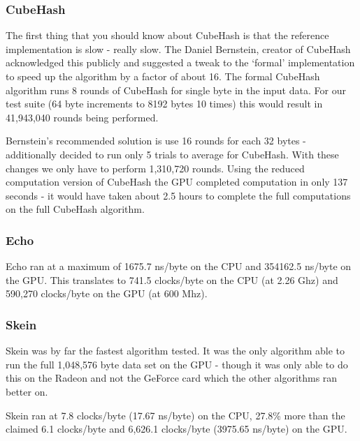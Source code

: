 \subsubsection*{CubeHash}
The first thing that you should know about CubeHash is that the reference implementation is  slow - really slow.
The Daniel Bernstein, creator of CubeHash acknowledged this publicly\cite{Bernstein} and suggested a tweak to the `formal' implementation to speed up the algorithm by a factor of about 16.
The formal CubeHash algorithm runs 8 rounds of CubeHash for single byte in the input data. For our test suite (64 byte increments to 8192 bytes 10 times) this would result in 41,943,040 rounds being performed.

Bernstein's recommended solution is use 16 rounds for each 32 bytes - additionally decided to run only 5 trials to average for CubeHash.
With these changes we only have to perform 1,310,720 rounds.
Using the reduced computation version of CubeHash the GPU completed computation in only 137 seconds - it would have taken about 2.5 hours to complete the full computations on the full CubeHash algorithm.

\subsubsection*{Echo}
Echo ran at a maximum of 1675.7 ns/byte on the CPU and 354162.5 ns/byte on the GPU.
This translates to 741.5 clocks/byte on the CPU (at 2.26 Ghz) and 590,270 clocks/byte on the GPU (at 600 Mhz).

\subsubsection*{Skein}
Skein was by far the fastest algorithm tested.
It was the only algorithm able to run the full 1,048,576 byte data set on the GPU - though it was only able to do this on the Radeon and not the GeForce card which the other algorithms ran better on.

Skein ran at 7.8 clocks/byte (17.67 ns/byte) on the CPU, 27.8\% more than the claimed 6.1 clocks/byte and 6,626.1 clocks/byte (3975.65 ns/byte) on the GPU.